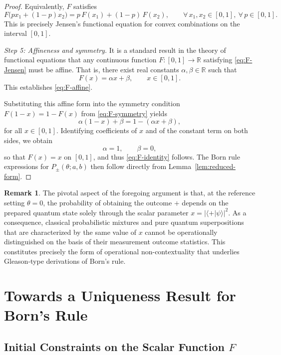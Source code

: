 \documentclass[11pt,a4paper]{article}
\numberwithin{equation}{section}
\theoremstyle{definition}
\newtheorem{remark}[theorem]{Remark}
\begin{document}
\begin{proof}
Equivalently, $F$ satisfies
\begin{equation}
\label{eq:F-Jensen}
F\bigl(p x_1 + (1-p)x_2\bigr)
=
p\,F(x_1) + (1-p)\,F(x_2),
\qquad
\forall\,x_1,x_2\in[0,1],\ \forall\,p\in[0,1].
\end{equation}
This is precisely Jensen's functional equation for convex combinations
on the interval $[0,1]$.

\medskip\noindent
\emph{Step 5: Affineness and symmetry.}
It is a standard result in the theory of functional equations that any continuous function $F:[0,1]\to\mathbb{R}$ satisfying
\eqref{eq:F-Jensen} must be affine. That is, there exist real constants
$\alpha,\beta\in\mathbb{R}$ such that
\[
F(x)=\alpha x + \beta,\qquad x\in[0,1].
\]
This establishes \eqref{eq:F-affine}.

Substituting this affine form into the symmetry condition
$F(1-x)=1-F(x)$ from \eqref{eq:F-symmetry} yields
\[
\alpha(1-x)+\beta = 1 - (\alpha x + \beta),
\]
for all $x\in[0,1]$. Identifying coefficients of $x$ and of the
constant term on both sides, we obtain
\[
\alpha = 1,\qquad \beta = 0,
\]
so that $F(x)=x$ on $[0,1]$, and thus \eqref{eq:F-identity} follows. The Born rule expressions for $P_\pm(\theta;a,b)$ then follow directly from Lemma~\ref{lem:reduced-form}.
\end{proof}

\begin{remark}
The pivotal aspect of the foregoing argument is that, at the reference setting $\theta = 0$, the probability of obtaining the outcome $+$ depends on the prepared quantum state solely through the scalar parameter $x = |\langle + | \psi \rangle|^2$. As a consequence, classical probabilistic mixtures and pure quantum superpositions that are characterized by the same value of $x$ cannot be operationally distinguished on the basis of their measurement outcome statistics. This constitutes precisely the form of operational non-contextuality that underlies Gleason-type derivations of Born’s rule.
\end{remark}

\section{Towards a Uniqueness Result for Born's Rule}
\label{sec:uniqueness}

\subsection{Initial Constraints on the Scalar Function \texorpdfstring{$F$}{F}}
\end{document}
